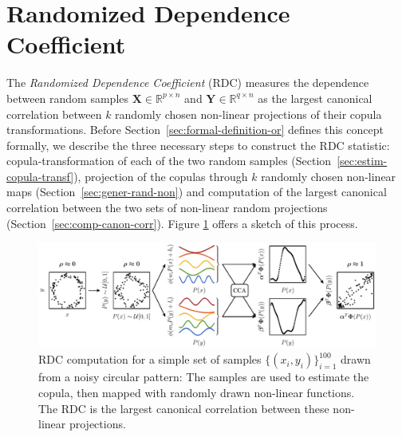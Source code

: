 \documentclass{article}
\begin{document}
\section{Randomized Dependence Coefficient} \label{sec:rdc} 
The \emph{Randomized Dependence Coefficient} (RDC) measures the dependence
between random samples $\bm X \in \mathbb{R}^{p\times n}$ and $\bm Y \in
\mathbb{R}^{q\times n}$ as the largest canonical correlation between $k$
randomly chosen non-linear projections of their copula transformations. Before
Section~\ref{sec:formal-definition-or} defines this concept formally, we
describe the three necessary steps to construct the RDC statistic:
copula-transformation of each of the two random samples
(Section~\ref{sec:estim-copula-transf}), projection of the copulas through $k$
randomly chosen non-linear maps (Section~\ref{sec:gener-rand-non}) and
computation of the largest canonical correlation between the two sets of
non-linear random projections (Section~\ref{sec:comp-canon-corr}). Figure
\ref{fig:rdcsteps} offers a sketch of this process.
\begin{figure}[h!]
  \includegraphics[width=\textwidth]{figures/pipeline.pdf}
  \caption{RDC computation for a simple set of samples
  $\{(x_i,y_i)\}_{i=1}^{100}$ drawn from a noisy circular pattern: The samples
  are used to estimate the copula, then mapped with randomly drawn non-linear
  functions. The RDC is the largest canonical correlation between these
  non-linear projections.}
  \label{fig:rdcsteps}
\end{figure}
\end{document}
